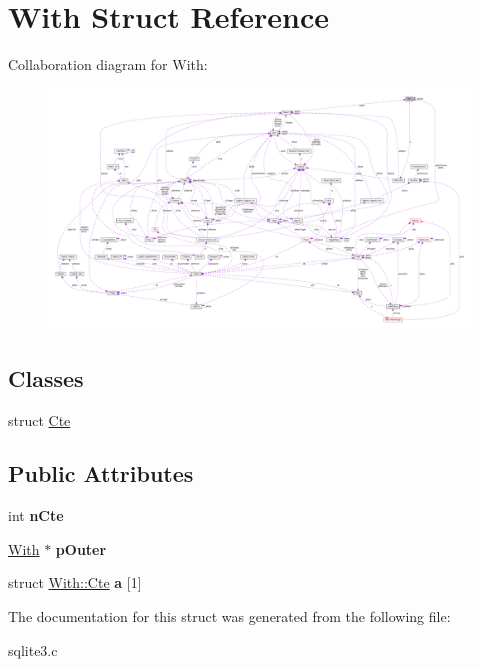 \hypertarget{structWith}{}\section{With Struct Reference}
\label{structWith}


Collaboration diagram for With\+:\nopagebreak
\begin{figure}[H]
\begin{center}
\leavevmode
\includegraphics[width=350pt]{structWith__coll__graph}
\end{center}
\end{figure}
\subsection*{Classes}
\begin{DoxyCompactItemize}
\item 
struct \hyperlink{structWith_1_1Cte}{Cte}
\end{DoxyCompactItemize}
\subsection*{Public Attributes}
\begin{DoxyCompactItemize}
\item 
int {\bfseries n\+Cte}\hypertarget{structWith_a42f5ecda008d1671bb317b8219f5a6ed}{}\label{structWith_a42f5ecda008d1671bb317b8219f5a6ed}

\item 
\hyperlink{structWith}{With} $\ast$ {\bfseries p\+Outer}\hypertarget{structWith_ab86b3af65b4e3d4c0b1ee04ffa50e1d9}{}\label{structWith_ab86b3af65b4e3d4c0b1ee04ffa50e1d9}

\item 
struct \hyperlink{structWith_1_1Cte}{With\+::\+Cte} {\bfseries a} \mbox{[}1\mbox{]}\hypertarget{structWith_a9c68a725bc482cbcc65132a4b7b8aaf2}{}\label{structWith_a9c68a725bc482cbcc65132a4b7b8aaf2}

\end{DoxyCompactItemize}


The documentation for this struct was generated from the following file\+:\begin{DoxyCompactItemize}
\item 
sqlite3.\+c\end{DoxyCompactItemize}
